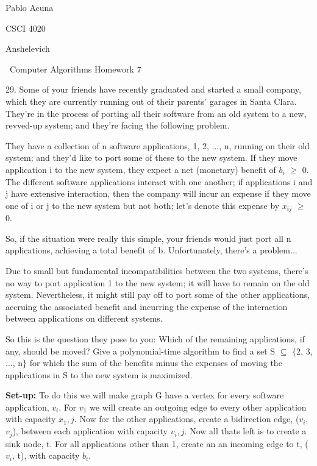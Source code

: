 \documentclass{article}
\begin{document}
Pablo Acuna

CSCI 4020

Anshelevich

{\centering\ Computer Algorithms Homework 7 \par}

29. Some of your friends have recently graduated and started a small company,
which they are currently running out of their parents’ garages in Santa Clara.
They’re in the process of porting all their software from an old system to a new,
revved-up system; and they’re facing the following problem.

They have a collection of n software applications, {1, 2, ..., n}, running on
their old system; and they’d like to port some of these to the new system. If
they move application i to the new system, they expect a net (monetary) benefit of
$b_i$ $\geq$ 0. The different software applications interact with one another; if
applications i and j have extensive interaction, then the company will incur an expense
if they move one of i or j to the new system but not both; let’s denote this expense by $x_{ij}$
$\geq$ 0.

So, if the situation were really this simple,
your friends would just port all n applications, achieving a total benefit of b.
Unfortunately, there’s a problem...

Due to small but fundamental incompatibilities between the two systems, there’s
no way to port application 1 to the new system; it will have to remain on the old system.
Nevertheless, it might still pay off to port some of the other applications, accruing the
associated benefit and incurring the expense of the interaction between applications on different systems.

So this is the question they pose to you: Which of the remaining applications, if any,
should be moved? Give a polynomial-time algorithm to find a set S $\subseteq$ $\{$2, 3, ..., n$\}$
for which the sum of the benefits minus the expenses of moving the applications in S
to the new system is maximized.

\textbf{Set-up:} To do this we will make graph G have a vertex
for every software application, $v_i$.  For $v_1$ we will create an outgoing edge to
every other application with capacity $x_1,j$.  Now for the other applications, create a
bidirection edge, ($v_i$, $v_j$), between each application with capacity $v_i,j$.  Now all thats left is to create
a sink node, t.  For all applications other than 1, create an an incoming edge to t, ($v_i$, t),
with capacity $b_i$.
\end{document}
